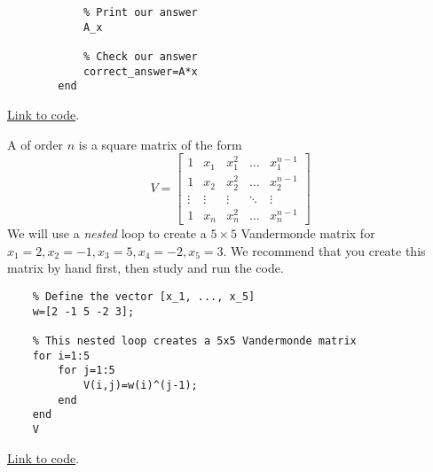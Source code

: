 \documentclass{ximera}
\begin{document}
\begin{example}
\begin{explanation}
\begin{verbatim}
            % Print our answer
            A_x

            % Check our answer
            correct_answer=A*x
        end
    \end{verbatim}

    \href{https://sagecell.sagemath.org/?z=eJxlUU1r20AQvQv0H4aAQU6lYNluY2L2IFoChRx6yckEo0hjexztrtldxSKH_vbOaq0oaXTRzLyPGT1N4NGiyWrckcIaZOkMdVDEUSE2S8hy-AH5DLL5Oo4WkOewgmwBS-6y7zCHfMl4lvfg3CMzuH3iLo4mn31fsXLaQBdHndiwG1vAag1cLAb-Paka3AHB0huC3n24ZSNT9ST8PCmma5iABLI9V7XyGY1nG322KZTsob6ClW5aqawvi_-2Naj27uCR8cYHEaZJN-2Pox2b_hXwEEfAz7k0itQ-ufpFEpUlfXHut3dQGgRSlZan0pXPDd5ceRdsLAb5BNjPr65HudeMihRORlfIuZ2Jb_Nc2TaOTg1VpWOBPypY_VbkqGx8ZJ7Gurqt3CW7QCq2nXhDo20i0zx8UNC-ZzCoig4CtuMcSOR3MrTD6MgjNY4u5glNRXh9KxJKj9PrLjn6PQMHVR2avhi2_zGkHOjWcGz2jOb92JHy84DVyxdKpY3hX7UNM1Fcs4Kd_wE4wcc1&lang=octave&interacts=eJyLjgUAARUAuQ==}{Link to code}.

    \end{explanation}   
    \end{example}

    \begin{example}\label{ex:vandermonde}
        A  of order $n$ is a square matrix of the form 
        $$V=\begin{bmatrix}
    1&x_1&x_1^2&\dots&x_1^{n-1}\\
    1&x_2&x_2^2&\dots&x_2^{n-1}\\
    \vdots&\vdots&\vdots&\ddots&\vdots\\
    1&x_n&x_n^2&\dots&x_n^{n-1}\end{bmatrix}$$
    We will use a \emph{nested} loop to create a $5\times 5$ Vandermonde matrix for $x_1=2, x_2=-1, x_3=5, x_4=-2, x_5=3$.  We recommend that you create this matrix by hand first, then study and run the code.
    
    \begin{verbatim}
    % Define the vector [x_1, ..., x_5]
    w=[2 -1 5 -2 3];
    
    % This nested loop creates a 5x5 Vandermonde matrix
    for i=1:5
        for j=1:5
            V(i,j)=w(i)^(j-1);
        end
    end
    V
    \end{verbatim}
    
    \href{https://sagecell.sagemath.org/?z=eJxFjEEKgzAURPeB3GE2goIKsWRTcdcjFDdiJeiXRjQpMdQcv7Fd9A08GAYmwY1mbQgKbxq9dejCIHKUZZkjDLLn7Gi6CoWARFHh0tecnUlwf-odhnZPE1ZrXxgdKU97vJJBolVmIrfZaGzKOx04m-O_bsRVcobIWZd_PWlTnS9Zc6Q6e6RLIbL6t5GZOPuq_QBP6C9I&lang=octave&interacts=eJyLjgUAARUAuQ==}{Link to code}.
    
    
    \end{example}    
\end{document}
